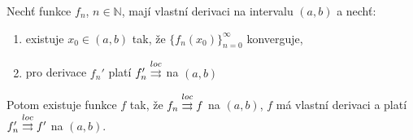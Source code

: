 \begin{vetat}
Nechť funkce $f_n$, $n \in \mathbb{N}$, mají vlastní derivaci na intervalu $(a,b)$ a nechť:
\begin{enumerate}
\item existuje $x_0 \in (a,b)$ tak, že $\{f_n(x_0)\}_{n=0}^{\infty}$ konverguje,
\item pro derivace $f_n'$ platí $f_n' \overset{loc}{\rightrightarrows}$ na $(a,b)$
\end{enumerate}
Potom existuje funkce $f$ tak, že $f_n \overset{loc}{\rightrightarrows} f$ na $(a,b)$, $f$ má vlastní derivaci a platí $f_n' \overset{loc}{\rightrightarrows} f'$ na $(a,b)$.
\end{vetat}
